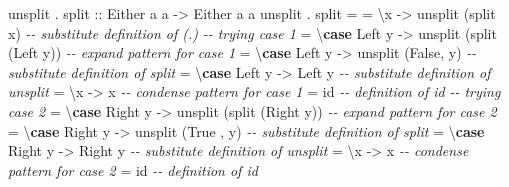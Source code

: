 \documentclass[]{article}
\newenvironment{Shaded}{}{}
\newcommand{\CommentTok}[1]{\textcolor[rgb]{0.38,0.63,0.69}{\textit{#1}}}
\newcommand{\DataTypeTok}[1]{\textcolor[rgb]{0.56,0.13,0.00}{#1}}
\newcommand{\FunctionTok}[1]{\textcolor[rgb]{0.02,0.16,0.49}{#1}}
\newcommand{\KeywordTok}[1]{\textcolor[rgb]{0.00,0.44,0.13}{\textbf{#1}}}
\newcommand{\NormalTok}[1]{#1}
\newcommand{\OperatorTok}[1]{\textcolor[rgb]{0.40,0.40,0.40}{#1}}
\newcommand{\OtherTok}[1]{\textcolor[rgb]{0.00,0.44,0.13}{#1}}
\begin{document}
\begin{Shaded}
\begin{Highlighting}[]
\NormalTok{unsplit }\OperatorTok{.}\OtherTok{ split ::} \DataTypeTok{Either}\NormalTok{ a a }\OtherTok{{-}>} \DataTypeTok{Either}\NormalTok{ a a}
\NormalTok{unsplit }\OperatorTok{.}\NormalTok{ split }\OtherTok{=}
    \OtherTok{=}\NormalTok{ \textbackslash{}x            }\OtherTok{{-}>}\NormalTok{ unsplit (split x)          }\CommentTok{{-}{-} substitute definition of (.)}
      \CommentTok{{-}{-} trying case 1}
    \OtherTok{=}\NormalTok{ \textbackslash{}}\KeywordTok{case} \DataTypeTok{Left}\NormalTok{  y }\OtherTok{{-}>}\NormalTok{ unsplit (split (}\DataTypeTok{Left}\NormalTok{  y))  }\CommentTok{{-}{-} expand pattern for case 1}
    \OtherTok{=}\NormalTok{ \textbackslash{}}\KeywordTok{case} \DataTypeTok{Left}\NormalTok{  y }\OtherTok{{-}>}\NormalTok{ unsplit (}\DataTypeTok{False}\NormalTok{, y)         }\CommentTok{{-}{-} substitute definition of split}
    \OtherTok{=}\NormalTok{ \textbackslash{}}\KeywordTok{case} \DataTypeTok{Left}\NormalTok{  y }\OtherTok{{-}>} \DataTypeTok{Left}\NormalTok{  y                    }\CommentTok{{-}{-} substitute definition of unsplit}
    \OtherTok{=}\NormalTok{ \textbackslash{}x            }\OtherTok{{-}>}\NormalTok{ x                          }\CommentTok{{-}{-} condense pattern for case 1}
    \OtherTok{=} \FunctionTok{id}                                          \CommentTok{{-}{-} definition of id}
      \CommentTok{{-}{-} trying case 2}
    \OtherTok{=}\NormalTok{ \textbackslash{}}\KeywordTok{case} \DataTypeTok{Right}\NormalTok{ y }\OtherTok{{-}>}\NormalTok{ unsplit (split (}\DataTypeTok{Right}\NormalTok{ y))  }\CommentTok{{-}{-} expand pattern for case 2}
    \OtherTok{=}\NormalTok{ \textbackslash{}}\KeywordTok{case} \DataTypeTok{Right}\NormalTok{ y }\OtherTok{{-}>}\NormalTok{ unsplit (}\DataTypeTok{True}\NormalTok{ , y)         }\CommentTok{{-}{-} substitute definition of split}
    \OtherTok{=}\NormalTok{ \textbackslash{}}\KeywordTok{case} \DataTypeTok{Right}\NormalTok{ y }\OtherTok{{-}>} \DataTypeTok{Right}\NormalTok{ y                    }\CommentTok{{-}{-} substitute definition of unsplit}
    \OtherTok{=}\NormalTok{ \textbackslash{}x            }\OtherTok{{-}>}\NormalTok{ x                          }\CommentTok{{-}{-} condense pattern for case 2}
    \OtherTok{=} \FunctionTok{id}                                          \CommentTok{{-}{-} definition of id}
\end{Highlighting}
\end{Shaded}
\end{document}
